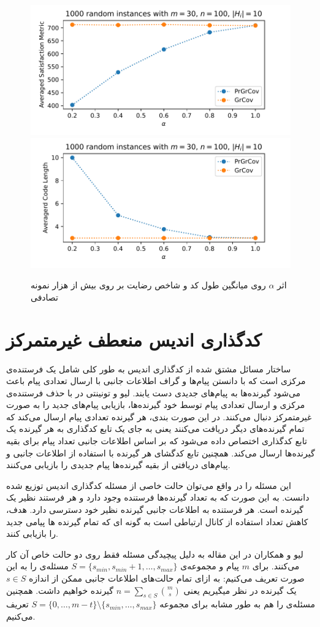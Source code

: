 \begin{figure}[H]
	\centering
	{\includegraphics[width=0.4\linewidth]{figs/chapter4/cost_alpha_grcov_prgrcov.pdf}\vspace{-2ex}}
	{\includegraphics[width=0.4				\linewidth]{figs/chapter4/code_length_alpha_grcov_prgrcov.pdf}\vspace{-2ex}}
	\caption{
		اثر
		$\alpha$
		روی میانگین طول کد و شاخص رضایت بر روی بیش از هزار نمونه تصادفی
}
	\label{fig:alpha}
\end{figure}

\section{کدگذاری اندیس منعطف غیرمتمرکز}
ساختار مسائل مشتق شده از کدگذاری اندیس به طور کلی شامل یک فرستنده‌ی مرکزی است که با دانستن پیام‌ها و گراف اطلاعات جانبی با ارسال تعدادی پیام باعث می‌شود گیرنده‌ها به پیام‌های جدیدی دست یابند. لیو و تونینتی در
\cite{paper:Decentralized}
با حذف فرستنده‌ی مرکزی و ارسال تعدادی پیام توسط خود گیرنده‌ها، بازیابی پیام‌های جدید را به صورت غیرمتمرکز دنبال می‌کنند. در این صورت بندی، هر گیرنده تعدادی پیام ارسال می‌کند که تمام گیرنده‌های دیگر دریافت می‌کنند یعنی به جای یک تابع کدگذاری به هر گیرنده یک تابع کدگذاری اختصاص داده می‌شود که بر اساس اطلاعات جانبی تعداد پیام برای بقیه گیرنده‌ها ارسال می‌کند. همچنین تابع کدگشای هر گیرنده با استفاده از اطلاعات جانبی و پیام‌های دریافتی از بقیه گیرنده‌ها پیام جدیدی را بازیابی می‌کنند.

این مسئله را در واقع می‌توان حالت خاصی از مسئله کدگذاری اندیس توزیع شده
\cite{9022912}
دانست. به این صورت که به تعداد گیرنده‌ها فرستنده وجود دارد و هر فرستند نظیر یک گیرنده است. هر فرستنده به اطلاعات جانبی گیرنده نظیر خود دسترسی دارد. هدف، کاهش تعداد استفاده از کانال ارتباطی است به گونه ای که تمام گیرنده ها پیامی جدید را بازیابی کنند.

لیو و همکاران در این مقاله به دلیل پیچیدگی مسئله فقط روی دو حالت خاص آن کار می‌کنند. برای 
$m$
پیام و مجموعه‌ی
$S = \{s_{min}, s_{min }+ 1, \ldots, s_{max}\}$
مسئله‌ی 
را به این صورت تعریف می‌کنیم: به ازای تمام حالت‌های اطلاعات جانبی ممکن از اندازه
$s \in S$
یک گیرنده در نظر میگیریم یعنی
$n = \sum\limits_{s \in S} \binom{m}{s}$
گیرنده خواهیم داشت. همچنین مسئله‌ی
را هم به طور مشابه برای مجموعه
$S = \{0, \ldots, m - t\} \setminus \{s_{min}, \ldots, s_{max}\}$
تعریف می‌کنیم.

